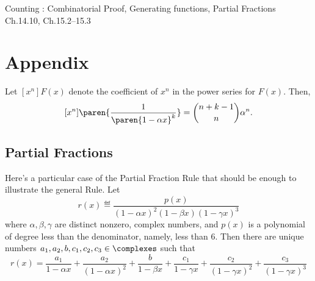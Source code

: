 \documentclass[handout]{mcs}
\begin{document}

\begin{staffnotes}
Counting : Combinatorial Proof, Generating functions, Partial Fractions Ch.14.10, Ch.15.2--15.3
\end{staffnotes}



\examspace
\section*{Appendix}
Let $[x^n]F(x)$ denote the coefficient of $x^n$ in the power series
for $F(x)$.  Then,
\[
[x^n]\paren{\frac{1}{\paren{1-\alpha x}^k}} = \binom{n+k-1}{n}\alpha^n.
\]

\subsection*{Partial Fractions}

Here's a particular case of the Partial Fraction Rule that should be
enough to illustrate the general Rule.  Let
\[
r(x) \eqdef \frac{p(x)}{(1-\alpha x)^2 (1-\beta x) (1-\gamma x)^3}
\]
where $\alpha, \beta, \gamma$ are distinct nonzero, complex numbers,
and $p(x)$ is a polynomial of degree less than the denominator,
namely, less than 6.  Then there are unique numbers
$a_1,a_2,b,c_1,c_2,c_3 \in \complexes$ such that
\[
r(x)
= \frac{a_1}{1-\alpha x} + \frac{a_2}{(1-\alpha x)^2}
+ \frac{b}{1-\beta x}
+ \frac{c_1}{1-\gamma x} + \frac{c_2}{(1-\gamma x)^2} + \frac{c_3}{(1-\gamma x)^3}
\]

\iffalse Explain why partial fractions together with~\eqref{1axk} imply
that there is a closed form expression (allowing binomial coefficients)
for $[x^n]\paren{R(x)/S(x)}$ for arbitrary polynomials $R(x),S(x)$.
\fi

\end{document}

